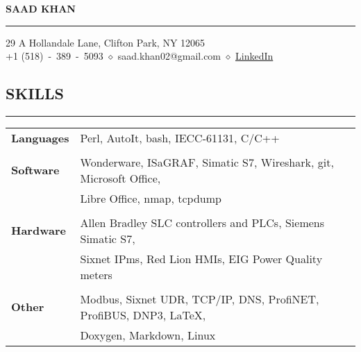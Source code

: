 \documentclass{article}
\begin{document}
%
\begin{center}
    {\MakeUppercase{\huge\bf Saad Khan}} \\
    \bigskip
    \hrule
    \bigskip
    29 A Hollandale Lane, Clifton Park, NY 12065 \\
    +1 (518)~-~389~-~5093
    $\diamond$
    saad.khan02@gmail.com
    $\diamond$
    \href{https://www.linkedin.com/profile/view?id=AAIAAAVLKxsBOoCE_mqWdf0x7GWsi2sKpbRfCXI&trk=nav_responsive_tab_profile}
    {LinkedIn}
    \\
    \bigskip
\end{center}

%
\subsection*{\MakeUppercase{\bf Skills}}
    \hrule
    \bigskip
    \begin{tabular}{l l}
    {\bfseries Languages} &
    Perl, AutoIt, bash, IECC-61131, C/C++\\
    \\
    {\bfseries Software} &
    Wonderware, ISaGRAF, Simatic S7, Wireshark, git, Microsoft Office,\\
    &
    Libre Office, nmap, tcpdump \\
    \\
    {\bfseries Hardware} &
    Allen Bradley SLC controllers and PLCs, Siemens Simatic S7,\\
    &
    Sixnet IPms, Red Lion HMIs, EIG Power Quality meters \\
    \\
    {\bfseries Other} &
    Modbus, Sixnet UDR, TCP/IP, DNS, ProfiNET, ProfiBUS, DNP3, \LaTeX, \\
    &
    Doxygen, Markdown, Linux \\
    \end{tabular}
    \bigskip

%
\end{document}
